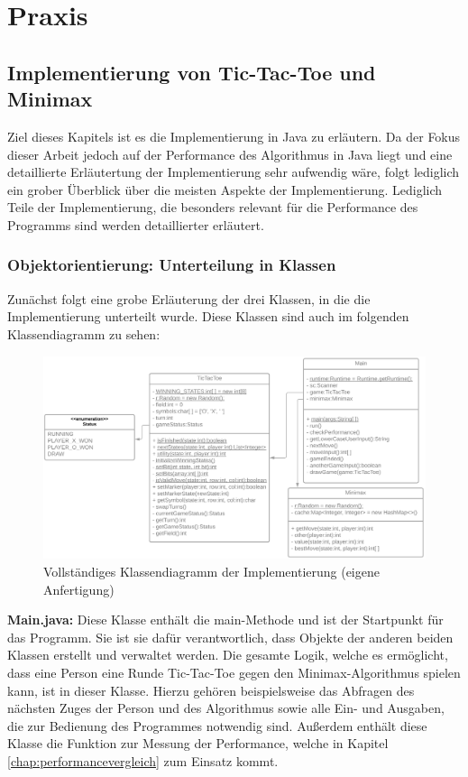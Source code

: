 \chapter{Praxis}

\section{Implementierung von Tic-Tac-Toe und Minimax}
Ziel dieses Kapitels ist es die Implementierung in Java zu erläutern. Da der Fokus dieser Arbeit jedoch auf der Performance
des Algorithmus in Java liegt und eine detaillierte Erläutertung der Implementierung sehr aufwendig wäre, folgt lediglich
ein grober Überblick über die meisten Aspekte der Implementierung. Lediglich Teile der Implementierung, die besonders relevant
für die Performance des Programms sind werden detaillierter erläutert. 

\subsection{Objektorientierung: Unterteilung in Klassen}
Zunächst folgt eine grobe Erläuterung der drei Klassen, in die die Implementierung unterteilt wurde.
Diese Klassen sind auch im folgenden Klassendiagramm zu sehen:
\begin{figure}[H]
    \centering
    \includegraphics[scale=0.2]{img/uml_diagram.png}
    \caption[Vollständiges Klassendiagramm der Implementierung]{Vollständiges Klassendiagramm der Implementierung (eigene Anfertigung)} %
    \label{fig:uml}
\end{figure}

\textbf{Main.java:} Diese Klasse enthält die main-Methode und ist der Startpunkt für das Programm. Sie ist sie dafür
verantwortlich, dass Objekte der anderen beiden Klassen erstellt und verwaltet werden. Die gesamte Logik, welche es ermöglicht, dass 
eine Person eine Runde Tic-Tac-Toe gegen den Minimax-Algorithmus spielen kann, ist in dieser Klasse. Hierzu gehören beispielsweise 
das Abfragen des nächsten Zuges der Person und des Algorithmus sowie alle Ein- und Ausgaben, die zur Bedienung des Programmes notwendig sind. 
Außerdem enthält diese Klasse die Funktion zur Messung der Performance, welche in Kapitel \ref{chap:performancevergleich} zum Einsatz kommt.

